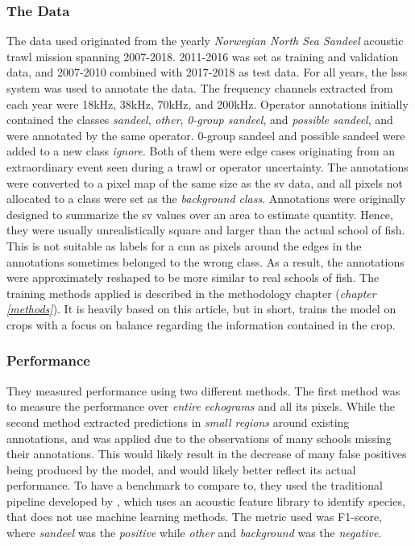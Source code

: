     \subsubsection{The Data}
    The data used originated from the yearly \textit{Norwegian North Sea Sandeel} acoustic trawl mission spanning 2007-2018. 2011-2016 was set as training and validation data, and 2007-2010 combined with 2017-2018 as test data. For all years, the \gls{lsss} system was used to annotate the data. The frequency channels extracted from each year were 18kHz, 38kHz, 70kHz, and 200kHz. Operator annotations initially contained the classes \textit{sandeel}, \textit{other}, \textit{0-group sandeel}, and \textit{possible sandeel}, and were annotated by the same operator. 0-group sandeel and possible sandeel were added to a new class \textit{ignore}. Both of them were edge cases originating from an extraordinary event seen during a trawl or operator uncertainty. The annotations were converted to a pixel map of the same size as the \gls{sv} data, and all pixels not allocated to a class were set as the \textit{background class}. Annotations were originally designed to summarize the \gls{sv} values over an area to estimate quantity. Hence, they were usually unrealistically square and larger than the actual school of fish. This is not suitable as labels for a \gls{cnn} as pixels around the edges in the annotations sometimes belonged to the wrong class. As a result, the annotations were approximately reshaped to be more similar to real schools of fish. The training methods applied is described in the methodology chapter (\textit{chapter \ref{methods}}). It is heavily based on this article\cite{brautaset2020acoustic}, but in short, trains the model on crops with a focus on balance regarding the information contained in the crop.
    
    \subsubsection{Performance}
    They measured performance using two different methods\cite{brautaset2020acoustic}. The first method was to measure the performance over \textit{entire echograms} and all its pixels. While the second method extracted predictions in \textit{small regions} around existing annotations, and was applied due to  the observations of many schools missing their annotations. This would likely result in the decrease of many false positives being produced by the model, and would likely better reflect its actual performance. To have a benchmark to compare to, they used the traditional pipeline developed by \citet{korneliussen2016acoustic}, which uses an acoustic feature library to identify species, that does not use machine learning methods. The metric used was F1-score, where \textit{sandeel} was the \textit{positive}   while \textit{other} and \textit{background} was the \textit{negative}. 
    
